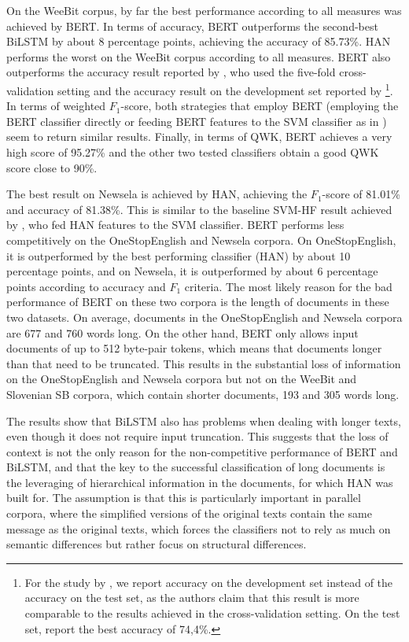\documentclass{clv3}
\begin{document}
On the WeeBit corpus, by far the best performance according to all measures was achieved by BERT. In terms of accuracy, BERT  outperforms the second-best BiLSTM by about 8 percentage points, achieving the accuracy of 85.73\%. HAN performs the worst on the WeeBit corpus according to all measures. BERT also outperforms the accuracy result reported by \citet{xia2016text}, who used the five-fold cross-validation setting and the accuracy result on the development set reported by \citet{filighera2019automatic}\footnote{For the study by \citet{filighera2019automatic}, we report accuracy on the development set instead of the accuracy on the test set, as the authors claim that this result is more comparable to the results achieved in the cross-validation setting. On the test set, \citet{filighera2019automatic} report the best accuracy of 74,4\%.}. In terms of weighted $F_1$-score, both strategies that employ BERT (employing the BERT classifier directly or feeding BERT features to the SVM classifier as in \citet{deutsch2020linguistic}) seem to return similar results. Finally, in terms of QWK, BERT achieves a very high score of 95.27\% and the other two tested classifiers obtain a good   QWK score close to 90\%.  

The best result on Newsela is achieved by HAN, achieving the $F_1$-score of 81.01\% and accuracy of 81.38\%. This is similar to the baseline SVM-HF result achieved by \citet{deutsch2020linguistic}, who fed HAN features to the SVM classifier. BERT performs less competitively on the OneStopEnglish and Newsela corpora. On OneStopEnglish, it is outperformed by the best performing classifier (HAN) by about 10 percentage points, and on Newsela, it is outperformed by about 6 percentage points according to accuracy and $F_1$ criteria. The most likely reason for the bad performance of BERT on these two corpora is the length of documents in these two datasets. On average, documents in the OneStopEnglish and Newsela corpora are 677 and 760 words long. On the other hand, BERT only allows input documents of up to 512 byte-pair tokens, which means that documents longer than that need to be truncated. This results in the substantial loss of information on the OneStopEnglish and Newsela corpora but not on the WeeBit and Slovenian SB corpora, which contain shorter documents, 193 and 305 words long. 

The results show that BiLSTM also has problems when dealing with longer texts, even though it does not require input truncation. This suggests that the loss of context is not the only reason for the non-competitive performance of BERT and BiLSTM, and that the key to the successful classification of long documents is the leveraging of hierarchical information in the documents, for which HAN was built for. The assumption is that this is particularly important in parallel corpora, where the simplified versions of the original texts contain the same message as the original texts, which forces the classifiers not to rely as much on semantic differences but rather focus on structural differences. 
\end{document}
